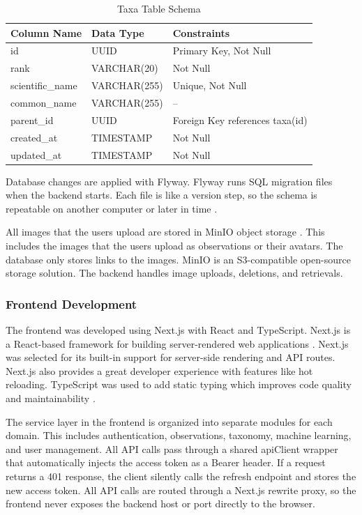 \begin{table}[H]
\centering
\caption{Taxa Table Schema}
\begin{tabular}{|l|l|l|}
\hline
\textbf{Column Name} & \textbf{Data Type} & \textbf{Constraints} \\ \hline
id & UUID & Primary Key, Not Null \\ \hline
rank & VARCHAR(20) & Not Null \\ \hline
scientific\_name & VARCHAR(255) & Unique, Not Null \\ \hline
common\_name & VARCHAR(255) & -- \\ \hline
parent\_id & UUID & Foreign Key references taxa(id) \\ \hline
created\_at & TIMESTAMP & Not Null \\ \hline
updated\_at & TIMESTAMP & Not Null \\ \hline
\end{tabular}
\label{tab:taxa_schema}
\end{table}

Database changes are applied with Flyway. Flyway runs SQL migration files when the backend starts. 
Each file is like a version step, so the schema is repeatable on another computer or later in time \cite{flyway2025}.

All images that the users upload are stored in MinIO object storage \cite{minio2025}. This includes the images that the users upload as observations or their avatars. 
The database only stores links to the images. MinIO is an S3-compatible open-source storage solution. 
The backend handles image uploads, deletions, and retrievals.

\subsubsection{Frontend Development}

The frontend was developed using Next.js with React and TypeScript. Next.js is a React-based framework for building server-rendered web applications \cite{nextjs2025, react2025}.
Next.js was selected for its built-in support for server-side rendering and API routes. Next.js also provides a great developer experience with features like hot reloading.
TypeScript was used to add static typing which improves code quality and maintainability \cite{typescript2025}.

The service layer in the frontend is organized into separate modules for each domain. This includes authentication, observations, taxonomy, machine learning, and user management. 
All API calls pass through a shared apiClient wrapper that automatically injects the access token as a Bearer header. If a request returns a 401 response, the client silently calls the refresh endpoint and stores the new access token.
All API calls are routed through a Next.js rewrite proxy, so the frontend never exposes the backend host or port directly to the browser.

